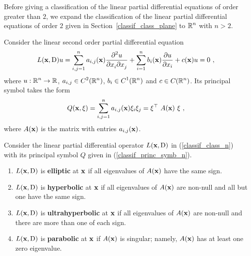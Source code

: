 Before giving a classification of the linear partial differential
equations of order greater than $2$, we expand the classification of
the linear partial differential equations of order 
$2$ given in Section~\ref{classif_class_plane} to
$\displaystyle \RR^n$ with $n>2$.

Consider the linear second order partial differential equation
\begin{equation} \label{classif_class_n}
L(\VEC{x}, \diff)u = \sum_{i,j=1}^n a_{i,j}(\VEC{x})
\pdydxnm{u}{x_i}{x_j}{2}{}{} + \sum_{i=1}^n b_i(\VEC{x})
\pdydx{u}{x_i} + c(\VEC{x})u = 0 \ ,
\end{equation}
where $\displaystyle u:\RR^n \rightarrow \RR$,
$\displaystyle a_{i,j} \in C^2(\RR^n)$,
$\displaystyle b_i \in C^1(\RR^n)$ and $\displaystyle c \in C(\RR^n)$.
Its principal symbol takes the form
\begin{equation} \label{classif_princ_symb_n}
Q(\VEC{x}, \VEC{\xi}) = \sum_{i,j=1}^n a_{i,j}(\VEC{x})\xi_i \xi_j
= \xi^\top\ A(\VEC{x})\ \xi \ ,
\end{equation}
where $A(\VEC{x})$ is the \nn matrix with entries $a_{i,j}(\VEC{x})$.

\begin{defn}\label{category2}
Consider the linear partial differential operator $L(\VEC{x}, \diff)$ in
(\ref{classif_class_n}) with its principal symbol $Q$ given in 
(\ref{classif_princ_symb_n}).
\begin{enumerate}
\item $L(\VEC{x}, \diff)$ is
  {\bfseries elliptic}
  at $\VEC{x}$ if all eigenvalues of $A(\VEC{x})$ have the same sign. 
\item $L(\VEC{x}, \diff)$ is
  {\bfseries hyperbolic}
  at $\VEC{x}$ if all eigenvalues of $A(\VEC{x})$ are non-null and all
  but one have the same sign.
\item $L(\VEC{x}, \diff)$ is 
{\bfseries ultrahyperbolic}
 at
$\VEC{x}$ if all eigenvalues of $A(\VEC{x})$ are non-null and there
are more than one of each sign.
\item $L(\VEC{x}, \diff)$ is {\bfseries parabolic}
 at $\VEC{x}$ if
$A(\VEC{x})$ is singular; namely, $A(\VEC{x})$ has at least one zero
eigenvalue.
\end{enumerate}
\end{defn}

